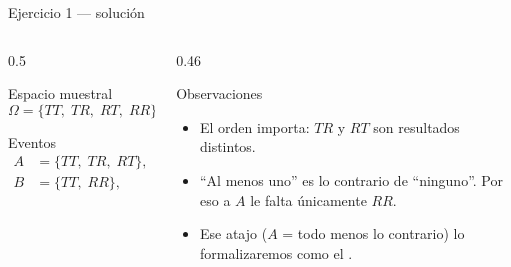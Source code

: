 \documentclass[aspectratio=169,10pt]{beamer}
\begin{document}
\begin{frame}{Ejercicio 1 — solución}
  \begin{columns}[T,onlytextwidth]
    \begin{column}{0.5\textwidth}
      \begin{block}{Espacio muestral}
        \[ \Omega=\{TT,\;TR,\;RT,\;RR\},\qquad \#\Omega=4 \]
      \end{block}
      \begin{block}{Eventos}
        \begin{align*}
          A &= \{TT,\;TR,\;RT\}, & \#A &= 3\\
          B &= \{TT,\;RR\},      & \#B &= 2
        \end{align*}
      \end{block}
    \end{column}
    \begin{column}{0.46\textwidth}
      \begin{exampleblock}{Observaciones}
        \begin{itemize}
          \item El orden importa: $TR$ y $RT$ son resultados distintos.
          \item ``Al menos uno'' es lo contrario de ``ninguno''. Por eso a $A$
                le falta únicamente $RR$.
          \item Ese atajo ($A$ = todo menos lo contrario) lo formalizaremos
                como el .
        \end{itemize}
      \end{exampleblock}
    \end{column}
  \end{columns}
\end{frame}
\end{document}
